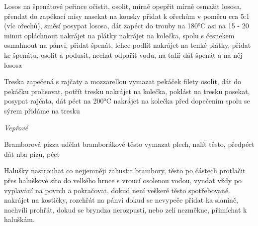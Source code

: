 \documentclass[12pt,a4paper]{article}
\begin{document}
\begin{recipe}{Losos na špenátové peřince}
   očistit, osolit, mírně opepřit
   mírně osmažit lososa, přendat do zapékací mísy
   nasekat na kousky
   přidat k ořechům v poměru cca 5:1 (víc ořechů), směsí posypat lososa, dát zapéct do trouby na 180°C asi na 15 - 20 minut
   opláchnout
   nakrájet na plátky
   nakrájet na kolečka, spolu s česnekem osmahnout na pánvi, přidat špenát, lehce podlít
   nakrájet na tenké plátky, přidat ke špenátu, osolit a podusit, nechat odpařit vodu, na talíř dát špenát a na něj lososa
\end{recipe}
\newpage

\begin{recipe}{Treska zapečená s rajčaty a mozzarellou}
   vymazat pekáček
   filety osolit, dát do pekáčku
   prolisovat, potřít tresku
   nakrájet na kolečka, poklást na tresku
   posekat, posypat rajčata, dát péct na 200°C
   nakrájet na kolečka
   před dopečením spolu se sýrem přidáme na tresku
\end{recipe}
\newpage

\vspace*{\fill}
\hfill {\Huge\it Vepřové}\hfill
\vspace*{\fill}
\newpage

\begin{recipe}{Bramborová pizza}
   udělat bramborákové těsto
   vymazat plech, nalít těsto, předpéct
   dát nba pizu, péct
\end{recipe}
\newpage

\begin{recipe}{Halušky}
   nastrouhat co nejjemněji
   zahustit brambory, těsto po částech protlačit přes haluškové síto do velkého hrnce s vroucí osolenou vodou, vyndat vždy po vyplavání na povrch
     a pokračovat, dokud není veškeré těsto spotřebované.
   nakrájet na kostičky, rozehřát na pánvi dokud se nevypeče
   přidat ka slanině, nachvíli prohřát, dokud se bryndza nerozpustí, nebo zelí nezměkne, přimíchat k haluškám.
\end{recipe}
 \newpage
\end{document}
